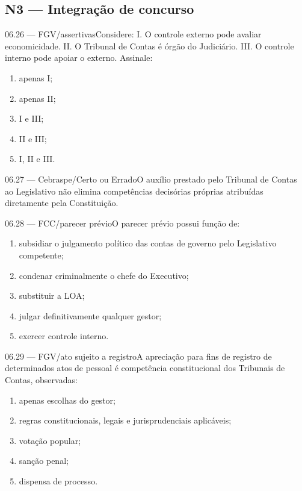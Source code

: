 \subsection*{N3 — Integração de concurso}
\begin{questao}{ 06.26 — FGV/assertivas}Considere: I. O controle externo pode avaliar economicidade. II. O Tribunal de Contas é órgão do Judiciário. III. O controle interno pode apoiar o externo. Assinale:\begin{enumerate}[label=\Alph*)]\item apenas I;\item apenas II;\item I e III;\item II e III;\item I, II e III.\end{enumerate}\end{questao}
\begin{questao}{ 06.27 — Cebraspe/Certo ou Errado}O auxílio prestado pelo Tribunal de Contas ao Legislativo não elimina competências decisórias próprias atribuídas diretamente pela Constituição.\end{questao}
\begin{questao}{ 06.28 — FCC/parecer prévio}O parecer prévio possui função de:\begin{enumerate}[label=\Alph*)]\item subsidiar o julgamento político das contas de governo pelo Legislativo competente;\item condenar criminalmente o chefe do Executivo;\item substituir a LOA;\item julgar definitivamente qualquer gestor;\item exercer controle interno.\end{enumerate}\end{questao}
\begin{questao}{ 06.29 — FGV/ato sujeito a registro}A apreciação para fins de registro de determinados atos de pessoal é competência constitucional dos Tribunais de Contas, observadas:\begin{enumerate}[label=\Alph*)]\item apenas escolhas do gestor;\item regras constitucionais, legais e jurisprudenciais aplicáveis;\item votação popular;\item sanção penal;\item dispensa de processo.\end{enumerate}\end{questao}
